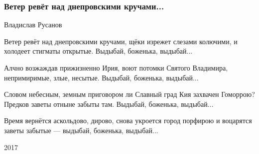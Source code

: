  
 
 

\subsubsection{Ветер ревёт над днепровскими кручами...}
\label{sec:poetry.rus.dnr.vladislav_rusanov.veter_revet_kruchi_dnepr}

Владислав Русанов

Ветер ревёт над днепровскими кручами,
щёки изрежет слезами колючими,
и холодеет стигматы открытые.
Выдыбай, боженька, выдыбай...

Алчно возжаждав прижизненно Ирия,
воют потомки Святого Владимира,
непримиримые, злые, несытые.
Выдыбай, боженька, выдыбай...

Словом небесным, земным приговором ли
Славный град Кия захвачен Гоморрою?
Предков заветы отныне забыты там.
Выдыбай, боженька, выдыбай...

Время вернётся аскольдово, дирово,
снова укроется город порфирою
и воцарятся заветы забытые —
выдыбай, боженька, выдыбай...

2017
